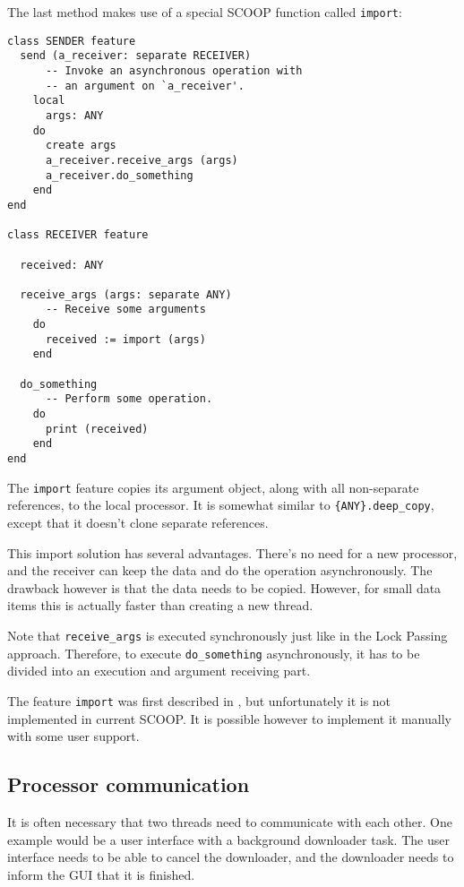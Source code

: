 \documentclass[a4paper,10pt]{article}
\begin{document}
The last method makes use of a special SCOOP function called \lstinline!import!:
\begin{lstlisting}
class SENDER feature
  send (a_receiver: separate RECEIVER)
      -- Invoke an asynchronous operation with
      -- an argument on `a_receiver'.
    local
      args: ANY
    do
      create args
      a_receiver.receive_args (args)
      a_receiver.do_something
    end
end

class RECEIVER feature
  
  received: ANY
  
  receive_args (args: separate ANY)
      -- Receive some arguments
    do
      received := import (args)
    end

  do_something
      -- Perform some operation.
    do
      print (received)
    end
end
\end{lstlisting}
The \lstinline!import! feature copies its argument object, along with all non-separate references, to the local processor.
It is somewhat similar to \lstinline!{ANY}.deep_copy!, except that it doesn't clone separate references.

This import solution has several advantages.
There's no need for a new processor, and the receiver can keep the data and do the operation asynchronously.
The drawback however is that the data needs to be copied.
However, for small data items this is actually faster than creating a new thread.

Note that \lstinline!receive_args! is executed synchronously just like in the Lock Passing approach.
Therefore, to execute \lstinline!do_something! asynchronously, it has to be divided into an execution and argument receiving part.

The feature \lstinline!import! was first described in , but unfortunately it is not implemented in current SCOOP.
It is possible however to implement it manually with some user support.

\subsection{Processor communication}
\label{sec:processor-communication}


It is often necessary that two threads need to communicate with each other.
One example would be a user interface with a background downloader task.
The user interface needs to be able to cancel the downloader, and the downloader needs to inform the GUI that it is finished.
\end{document}
